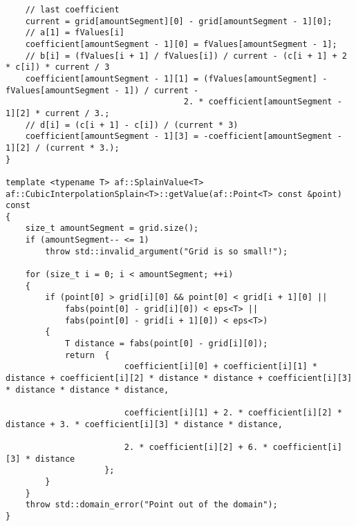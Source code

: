 \begin{enumerate}
\begin{lstlisting}
    // last coefficient
    current = grid[amountSegment][0] - grid[amountSegment - 1][0];
    // a[1] = fValues[i]
    coefficient[amountSegment - 1][0] = fValues[amountSegment - 1];
    // b[i] = (fValues[i + 1] / fValues[i]) / current - (c[i + 1] + 2 * c[i]) * current / 3
    coefficient[amountSegment - 1][1] = (fValues[amountSegment] - fValues[amountSegment - 1]) / current -
                                    2. * coefficient[amountSegment - 1][2] * current / 3.;
    // d[i] = (c[i + 1] - c[i]) / (current * 3)
    coefficient[amountSegment - 1][3] = -coefficient[amountSegment - 1][2] / (current * 3.);
}

template <typename T> af::SplainValue<T> af::CubicInterpolationSplain<T>::getValue(af::Point<T> const &point) const
{
    size_t amountSegment = grid.size();
    if (amountSegment-- <= 1)
        throw std::invalid_argument("Grid is so small!");

    for (size_t i = 0; i < amountSegment; ++i)
    {
        if (point[0] > grid[i][0] && point[0] < grid[i + 1][0] ||
            fabs(point[0] - grid[i][0]) < eps<T> ||
            fabs(point[0] - grid[i + 1][0]) < eps<T>)
        {
            T distance = fabs(point[0] - grid[i][0]);
            return  {
                        coefficient[i][0] + coefficient[i][1] * distance + coefficient[i][2] * distance * distance + coefficient[i][3] * distance * distance * distance,

                        coefficient[i][1] + 2. * coefficient[i][2] * distance + 3. * coefficient[i][3] * distance * distance,

                        2. * coefficient[i][2] + 6. * coefficient[i][3] * distance
                    };
        }
    }
    throw std::domain_error("Point out of the domain");
}
	\end{lstlisting}
\end{enumerate}
